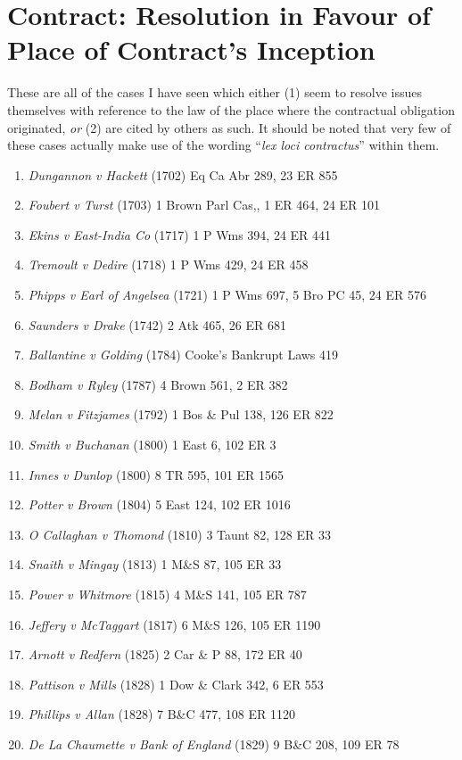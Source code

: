 \documentclass[twoside]{article}
\title{\Title}
\author{\Author}
\date{\today}
\begin{document}
\maketitle

\tableofcontents
\section{Contract: Resolution in Favour of Place of Contract's Inception}

These are all of the cases I have seen which either (1) seem to resolve issues themselves with reference to the law of the place where the contractual obligation originated, \textit{or} (2) are cited by others as such. It should be noted that very few of these cases actually make use of the wording “\textit{lex loci contractus}” within them.
\\ 
\begin{enumerate}
\item{\textit{Dungannon v Hackett} (1702) Eq Ca Abr 289, 23 ER 855}
\item{\textit{Foubert v Turst} (1703) 1 Brown Parl Cas,, 1 ER 464,  24 ER 101}
\item{\textit{Ekins v East-India Co} (1717) 1 P Wms 394, 24 ER 441}
\item{\textit{Tremoult v Dedire} (1718) 1 P Wms 429, 24 ER 458}
\item{\textit{Phipps v Earl of Angelsea} (1721) 1 P Wms 697, 5 Bro PC 45, 24 ER 576}
\item{\textit{Saunders v Drake} (1742) 2 Atk 465, 26 ER 681}
\item{\textit{Ballantine v Golding} (1784) Cooke’s Bankrupt Laws 419}
\item{\textit{Bodham v Ryley} (1787) 4 Brown 561, 2 ER 382}
\item{\textit{Melan v Fitzjames} (1792) 1 Bos \& Pul 138, 126 ER 822}
\item{\textit{Smith v Buchanan} (1800) 1 East 6, 102 ER 3}
\item{\textit{Innes v Dunlop} (1800) 8 TR 595, 101 ER 1565}
\item{\textit{Potter v Brown} (1804) 5 East 124, 102 ER 1016}
\item{\textit{O Callaghan v Thomond} (1810) 3 Taunt 82, 128 ER 33}
\item{\textit{Snaith v Mingay} (1813) 1 M\&S 87, 105 ER 33}
\item{\textit{Power v Whitmore} (1815) 4 M\&S 141, 105 ER 787}
\item{\textit{Jeffery v McTaggart} (1817) 6 M\&S 126, 105 ER 1190}
\item{\textit{Arnott v Redfern} (1825) 2 Car \& P 88, 172 ER 40}
\item{\textit{Pattison v Mills} (1828) 1 Dow \& Clark 342, 6 ER 553}
\item{\textit{Phillips v Allan} (1828) 7 B\&C 477, 108 ER 1120}
\item{\textit{De La Chaumette v Bank of England} (1829) 9 B\&C 208, 109 ER 78}
\end{enumerate}
\end{document}
